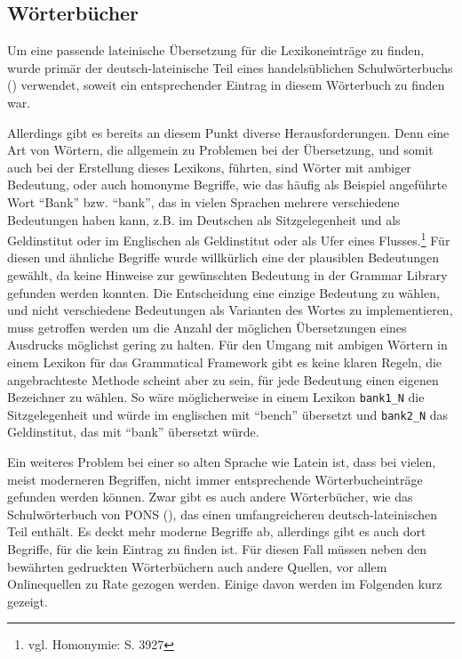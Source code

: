 \subsection{Wörterbücher}
\label{subsec:woerterbuch}
Um eine passende lateinische Übersetzung für die Lexikoneinträge zu finden, wurde primär der deutsch-lateinische Teil eines handelsüblichen Schulwörterbuchs (\cite{LANGENSCHEIDT1981}) verwendet, soweit ein entsprechender Eintrag in diesem Wörterbuch zu finden war. \par
Allerdings gibt es bereits an diesem Punkt diverse Herausforderungen. Denn eine Art von Wörtern, die allgemein zu Problemen bei der Übersetzung, und somit auch bei der Erstellung dieses Lexikons, führten, sind Wörter mit ambiger Bedeutung, oder auch homonyme Begriffe, wie das häufig als Beispiel angeführte Wort "`Bank"' bzw. "`bank"', das in vielen Sprachen mehrere verschiedene Bedeutungen haben kann, z.B. im Deutschen als Sitzgelegenheit und als Geldinstitut oder im Englischen als Geldinstitut oder als Ufer eines Flusses.\footnote{vgl. \cite{METZLER2004} Homonymie: S. 3927} Für diesen und ähnliche Begriffe wurde willkürlich eine der plausiblen Bedeutungen gewählt, da keine Hinweise zur gewünschten Bedeutung in der Grammar Library gefunden werden konnten. Die Entscheidung eine einzige Bedeutung zu wählen, und nicht verschiedene Bedeutungen als Varianten des Wortes zu implementieren, muss getroffen werden um die Anzahl der möglichen Übersetzungen eines Ausdrucks möglichst gering zu halten. Für den Umgang mit ambigen Wörtern in einem Lexikon für das Grammatical Framework gibt es keine klaren Regeln, die angebrachteste Methode scheint aber zu sein, für jede Bedeutung einen eigenen Bezeichner zu wählen. So wäre möglicherweise in einem Lexikon \texttt{bank1\_N} die Sitzgelegenheit und würde im englischen mit "`bench"' übersetzt und \texttt{bank2\_N} das Geldinstitut, das mit "`bank"' übersetzt würde.\par
Ein weiteres Problem bei einer so alten Sprache wie Latein ist, dass bei vielen, meist moderneren Begriffen, nicht immer entsprechende Wörterbucheinträge gefunden werden können. Zwar gibt es auch andere Wörterbücher, wie das Schulwörterbuch von PONS (\cite{PONS2012}), das einen umfangreicheren deutsch-lateinischen Teil enthält. Es deckt mehr moderne Begriffe ab, allerdings gibt es auch dort Begriffe, für die kein Eintrag zu finden ist. Für diesen Fall müssen neben den bewährten gedruckten Wörterbüchern auch andere Quellen, vor allem Onlinequellen zu Rate gezogen werden. Einige davon werden im Folgenden kurz gezeigt.\par
